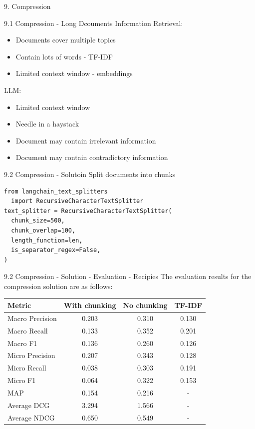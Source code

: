 \documentclass{beamer}
\begin{document}
\begin{frame}{9. Compression}
\end{frame}

\begin{frame}{9.1 Compression - Long Dcouments}
  Information Retrieval:
  \begin{itemize}
    \item Documents cover multiple topics
    \item Contain lots of words - TF-IDF
    \item Limited context window - embeddings
  \end{itemize}
  LLM:
  \begin{itemize}
    \item Limited context window
    \item Needle in a haystack
    \item Document may contain irrelevant information
    \item Document may contain contradictory information
  \end{itemize}
\end{frame}

\begin{frame}[fragile]{9.2 Compression - Solutoin}
  Split documents into chunks
  \begin{verbatim}
from langchain_text_splitters
  import RecursiveCharacterTextSplitter
text_splitter = RecursiveCharacterTextSplitter(
  chunk_size=500,
  chunk_overlap=100,
  length_function=len,
  is_separator_regex=False,
)
\end{verbatim}
\end{frame}

\begin{frame}{9.2 Compression - Solution - Evaluation - Recipies}
  The evaluation results for the compression solution are as follows:
  \begin{table}
    \centering
    \begin{tabular}{|l|c|c|c|}
      \hline
      Metric          & With chunking & No chunking & TF-IDF \\
      \hline
      Macro Precision & 0.203         & 0.310       & 0.130  \\
      Macro Recall    & 0.133         & 0.352       & 0.201  \\
      Macro F1        & 0.136         & 0.260       & 0.126  \\
      Micro Precision & 0.207         & 0.343       & 0.128  \\
      Micro Recall    & 0.038         & 0.303       & 0.191  \\
      Micro F1        & 0.064         & 0.322       & 0.153  \\
      MAP             & 0.154         & 0.216       & -      \\
      Average DCG     & 3.294         & 1.566       & -      \\
      Average NDCG    & 0.650         & 0.549       & -      \\
      \hline
    \end{tabular}
  \end{table}
\end{frame}
\end{document}
